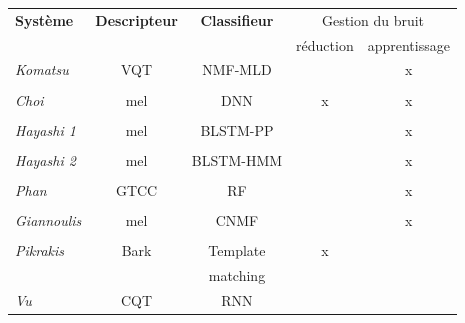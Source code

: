 \begin{table}[t]
\begin{center}
\scriptsize
\begin{tabular}{lcccc}
\textbf{Système}             & \textbf{Descripteur}         & \textbf{Classifieur} &   \multicolumn{2}{c}{Gestion du bruit} \\ 
                             &                              &                      & réduction & apprentissage   \\ 
\hline
\emph{Komatsu}               &     VQT                      & NMF-MLD              &           & x \\ 
\citep{Komatsu2016}          &                              &                      &           &   \\ 
\hline
\emph{Choi}                  &     mel                      & DNN                  & x         & x \\ 
\citep{Choi2016}             &                              &                      &           & \\ 
\hline
\emph{Hayashi 1}             &     mel                      & BLSTM-PP             &           & x \\ 
\citep{Hayashi2016}          &                              &                      &           & \\ 
\hline
\emph{Hayashi 2}             &     mel                      & BLSTM-HMM            &           & x \\ 
\citep{Hayashi2016}          &                              &                      &           & \\ 
\hline
\emph{Phan}                  &     GTCC                     & RF                   &           & x\\ 
\citep{Phan2016}             &                              &                      &           & \\ 
\hline
\emph{Giannoulis}            &     mel                      & CNMF                 &           & x\\ 
\citep{Giannoulis2016}       &                              &                      &           & \\ 
\hline
\emph{Pikrakis}              &     Bark                     & Template             & x         & \\ 
\citep{Pikrakis2016}         &                              & matching             &           & \\ 
\hline
\emph{Vu}                    &     CQT                      & RNN                  &           & \\ 

\end{tabular}
\end{center}
\end{table}
